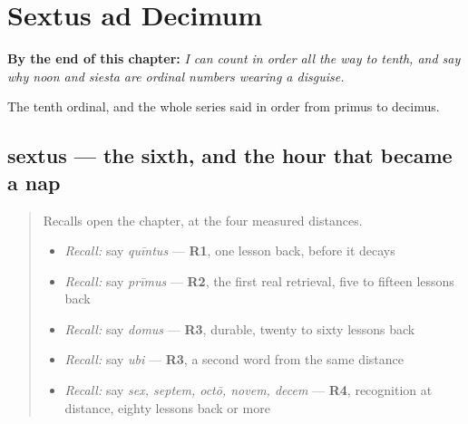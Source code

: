 
\chapter{Sextus ad Decimum}
\label{ch:la-ordinals-to-tenth}

\begin{chapteropening}
\textbf{By the end of this chapter:} \emph{I can count in order all the way to tenth, and say why noon and siesta are ordinal numbers wearing a disguise.}

The tenth ordinal, and the whole series said in order from primus to decimus.
\end{chapteropening}

\section[sextus, sexta, sextum]{sextus — the sixth, and the hour that became a nap}

\label{lesson:LA-C56-sextus}



\begin{quote}
Recalls open the chapter, at the four measured distances.

\begin{itemize}
\raggedright
  \item \emph{Recall:} say \emph{quīntus} — \textbf{R1}, one lesson back, before it decays
  \item \emph{Recall:} say \emph{prīmus} — \textbf{R2}, the first real retrieval, five to fifteen lessons back
  \item \emph{Recall:} say \emph{domus} — \textbf{R3}, durable, twenty to sixty lessons back
  \item \emph{Recall:} say \emph{ubi} — \textbf{R3}, a second word from the same distance
  \item \emph{Recall:} say \emph{sex, septem, octō, novem, decem} — \textbf{R4}, recognition at distance, eighty lessons back or more
\end{itemize}
\end{quote}

